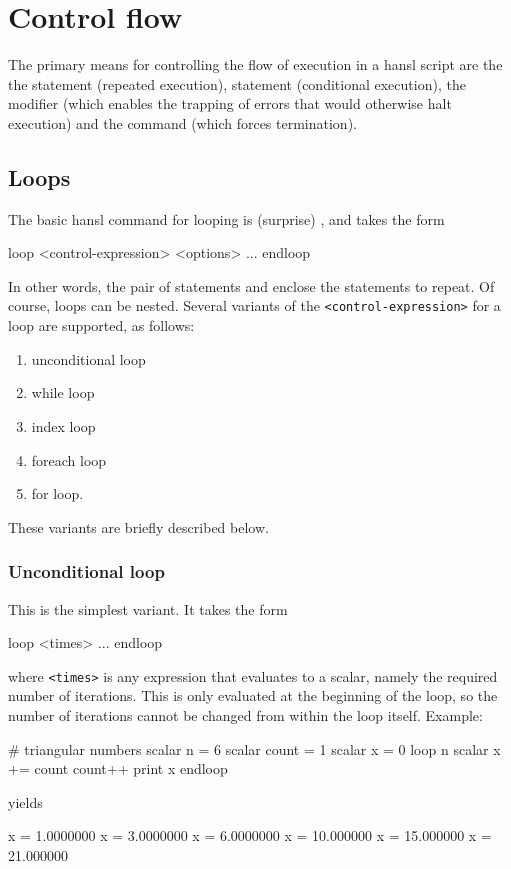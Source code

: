 \chapter{Control flow}
\label{chap:hp-ctrlflow}

The primary means for controlling the flow of execution in a hansl
script are the the  statement (repeated execution), 
statement (conditional execution), the  modifier (which
enables the trapping of errors that would otherwise halt execution)
and the  command (which forces termination).

\section{Loops}
\label{sec:hr-loops}

The basic hansl command for looping is (surprise) , and
takes the form
\begin{code}
loop <control-expression> <options>
    ...
endloop
\end{code}
In other words, the pair of statements  and 
enclose the statements to repeat. Of course, loops can be nested.
Several variants of the \texttt{<control-expression>} for a loop are
supported, as follows:
\begin{enumerate}
\item unconditional loop
\item while loop
\item index loop
\item foreach loop
\item for loop.
\end{enumerate}
These variants are briefly described below.

\subsection{Unconditional loop}

This is the simplest variant. It takes the form
\begin{code}
loop <times>
   ...
endloop
\end{code}
where \texttt{<times>} is any expression that evaluates to a scalar,
namely the required number of iterations. This is only evaluated at
the beginning of the loop, so the number of iterations cannot be
changed from within the loop itself. Example:
\begin{code}
# triangular numbers
scalar n = 6
scalar count = 1
scalar x = 0
loop n
    scalar x += count
    count++
    print x
endloop
\end{code}
yields
\begin{code}
              x =  1.0000000
              x =  3.0000000
              x =  6.0000000
              x =  10.000000
              x =  15.000000
              x =  21.000000
\end{code}

